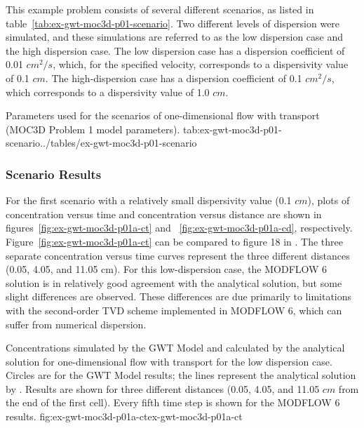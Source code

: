 This example problem consists of several different scenarios, as listed in table~\ref{tab:ex-gwt-moc3d-p01-scenario}.  Two different levels of dispersion were simulated, and these simulations are referred to as the low dispersion case and the high dispersion case.  The low dispersion case has a dispersion coefficient of 0.01 $cm^2/s$, which, for the specified velocity, corresponds to a dispersivity value of 0.1 $cm$.  The high-dispersion case has a dispersion coefficient of 0.1 $cm^2/s$, which corresponds to a dispersivity value of 1.0 $cm$.

\begin{ScenarioTable}{
                                   Parameters used for the scenarios of one-dimensional flow with transport (MOC3D Problem 1 model parameters).
                                   }{tab:ex-gwt-moc3d-p01-scenario}{../tables/ex-gwt-moc3d-p01-scenario}
\end{ScenarioTable}

\subsubsection{Scenario Results}

For the first scenario with a relatively small dispersivity value (0.1 $cm$), plots of concentration versus time and concentration versus distance are shown in figures~\ref{fig:ex-gwt-moc3d-p01a-ct} and ~\ref{fig:ex-gwt-moc3d-p01a-cd}, respectively.  Figure~\ref{fig:ex-gwt-moc3d-p01a-ct} can be compared to figure 18 in \cite{konikow1996three}. The three separate concentration versus time curves represent the three different distances (0.05, 4.05, and 11.05 cm).  For this low-dispersion case, the MODFLOW 6 solution is in relatively good agreement with the analytical solution, but some slight differences are observed.  These differences are due primarily to limitations with the second-order TVD scheme implemented in MODFLOW 6, which can suffer from numerical dispersion.

\begin{StandardFigure}{
                                     Concentrations simulated by the \mf GWT Model and calculated by the analytical solution for one-dimensional flow with transport for the low dispersion case.  Circles are for the GWT Model results; the lines represent the analytical solution by \cite{wexler1992}.  Results are shown for three different distances (0.05, 4.05, and 11.05 $cm$ from the end of the first cell).  Every fifth time step is shown for the MODFLOW 6 results.
                                     }{fig:ex-gwt-moc3d-p01a-ct}{ex-gwt-moc3d-p01a-ct}
\end{StandardFigure}            

